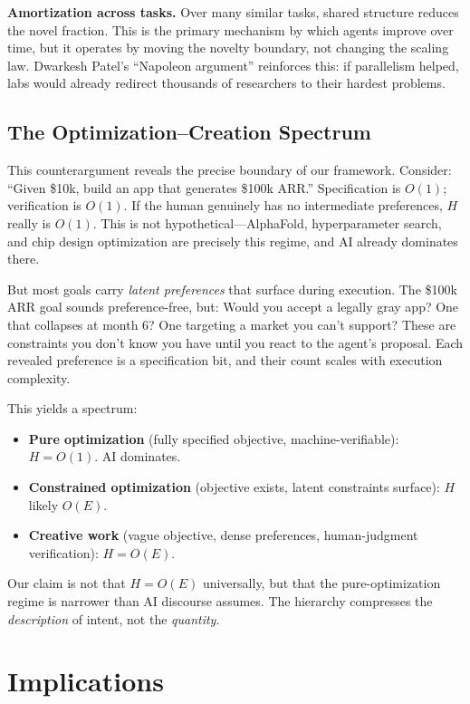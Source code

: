 \documentclass[11pt,a4paper]{article}
\begin{document}
\textbf{Amortization across tasks.} Over many similar tasks, shared structure reduces the novel fraction. This is the primary mechanism by which agents improve over time, but it operates by moving the novelty boundary, not changing the scaling law. Dwarkesh Patel's ``Napoleon argument'' \citep{patel2023} reinforces this: if parallelism helped, labs would already redirect thousands of researchers to their hardest problems.

\subsection{The Optimization--Creation Spectrum}

This counterargument reveals the precise boundary of our framework. Consider: ``Given \$10k, build an app that generates \$100k ARR.'' Specification is $O(1)$; verification is $O(1)$. If the human genuinely has no intermediate preferences, $H$ really is $O(1)$. This is not hypothetical---AlphaFold, hyperparameter search, and chip design optimization are precisely this regime, and AI already dominates there.

But most goals carry \emph{latent preferences} that surface during execution. The \$100k ARR goal sounds preference-free, but: Would you accept a legally gray app? One that collapses at month 6? One targeting a market you can't support? These are constraints you don't know you have until you react to the agent's proposal. Each revealed preference is a specification bit, and their count scales with execution complexity.

This yields a spectrum:
\begin{itemize}
\item \textbf{Pure optimization} (fully specified objective, machine-verifiable): $H = O(1)$. AI dominates.
\item \textbf{Constrained optimization} (objective exists, latent constraints surface): $H$ likely $O(E)$.
\item \textbf{Creative work} (vague objective, dense preferences, human-judgment verification): $H = O(E)$.
\end{itemize}

Our claim is not that $H = O(E)$ universally, but that the pure-optimization regime is narrower than AI discourse assumes. The hierarchy compresses the \emph{description} of intent, not the \emph{quantity}.

\section{Implications}
\label{sec:implications}
\end{document}
